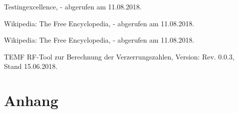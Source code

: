 \documentclass[../Report.tex]{subfiles}
\begin{document}
\begin{thebibliography}{9}
	Testingexcellence, 
	- abgerufen am 11.08.2018.
	
	Wikipedia: The Free Encyclopedia,
	- abgerufen am 11.08.2018.
	
	Wikipedia: The Free Encyclopedia,
	- abgerufen am 11.08.2018.
		
	TEMF RF-Tool zur Berechnung der Verzerrungszahlen, 
	Version: Rev. 0.0.3, 			
	Stand 15.06.2018.
	
\end{thebibliography}

\chapter{Anhang}
\label{chap:anhang}
\end{document}
